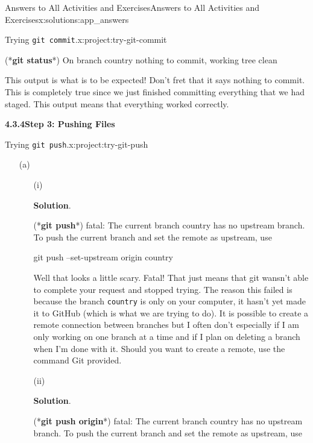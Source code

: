 \documentclass[oneside,10pt,]{book}
\newcommand{\blocktitlefont}{\relax}
\newcommand{\mono}[1]{\texttt{#1}}
\newcommand{\consoleinput}[1]{\textbf{#1}}
\begin{document}
\begin{solutions-chapter}{Answers to All Activities and Exercises}{}{Answers to All Activities and Exercises}{}{}{x:solutions:app_answers}
\begin{projectsolution}{4.6}{Trying \mono{git commit}.}{x:project:try-git-commit}
\begin{enumerate}[font=\bfseries,label=(\alph*),ref=\alph*]
\begin{console}{0}{1}{0}
(*\consoleinput{git status}*)
On branch country
nothing to commit, working tree clean
\end{console}
This output is what is to be expected! Don't fret that it says nothing to commit. This is completely true since we just finished committing everything that we had staged. This output means that everything worked correctly.%
\end{enumerate}
\end{projectsolution}%
\par\medskip
\noindent\textbf{\Large{}4.3.4\space\textperiodcentered\space{}Step 3: Pushing Files}
\begin{projectsolution}{4.7}{Trying \mono{git push}.}{x:project:try-git-push}%
\begin{enumerate}[font=\bfseries,label=(\alph*),ref=\alph*]
\item[(a)]\begin{enumerate}[font=\bfseries,label=(\roman*),ref=\theenumi.\roman*]
\item[(i)]\par\smallskip%
\noindent\textbf{\blocktitlefont Solution}.\hypertarget{g:solution:idp616266248-back}{}\quad{}\begin{console}{0}{1}{0}
(*\consoleinput{git push}*)
fatal: The current branch country has no upstream branch.
To push the current branch and set the remote as upstream, use

    git push --set-upstream origin country
\end{console}
Well that looks a little scary. Fatal! That just means that git wansn't able to complete your request and stopped trying. The reason this failed is because the branch \mono{country} is only on your computer, it hasn't yet made it to GitHub (which is what we are trying to do). It is possible to create a remote connection between branches but I often don't especially if I am only working on one branch at a time and if I plan on deleting a branch when I'm done with it. Should you want to create a remote, use the command Git provided.%
\item[(ii)]\par\smallskip%
\noindent\textbf{\blocktitlefont Solution}.\hypertarget{g:solution:idp616270856-back}{}\quad{}\begin{console}{0}{1}{0}
(*\consoleinput{git push origin}*)
fatal: The current branch country has no upstream branch.
To push the current branch and set the remote as upstream, use


\end{console}
\end{enumerate}
\end{enumerate}
\end{projectsolution}
\end{solutions-chapter}
\end{document}
